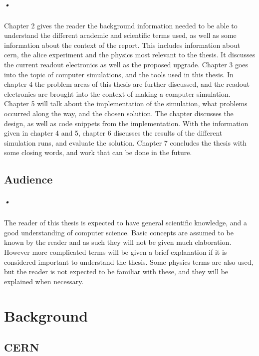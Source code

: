 \documentclass[a4paper, 12pt]{report}
\begin{document}
\paragraph{•}
Chapter 2 gives the reader the background information needed to be able to understand the different academic and scientific terms used, as well as some information about the context of the report.
This includes information about \gls{cern}, the \gls{alice} experiment and the physics most relevant to the thesis.
It discusses the current readout electronics as well as the proposed upgrade.
Chapter 3 goes into the topic of computer simulations, and the tools used in this thesis.
In chapter 4 the problem areas of this thesis are further discussed, and the readout electronics are brought into the context of making a computer simulation.
Chapter 5 will talk about the implementation of the simulation, what problems occurred along the way, and the chosen solution.
The chapter discusses the design, as well as code snippets from the implementation.
With the information given in chapter 4 and 5, chapter 6 discusses the results of the different simulation runs, and evaluate the solution.
Chapter 7 concludes the thesis with some closing words, and work that can be done in the future.

\section{Audience}

\paragraph{•}
The reader of this thesis is expected to have general scientific knowledge, and a good understanding of computer science.
Basic concepts are assumed to be known by the reader and as such they will not be given much elaboration.
However more complicated terms will be given a brief explanation if it is considered important to understand the thesis.
Some physics terms are also used, but the reader is not expected to be familiar with these, and they will be explained when necessary.


\chapter{Background}

\section{CERN}
\end{document}

